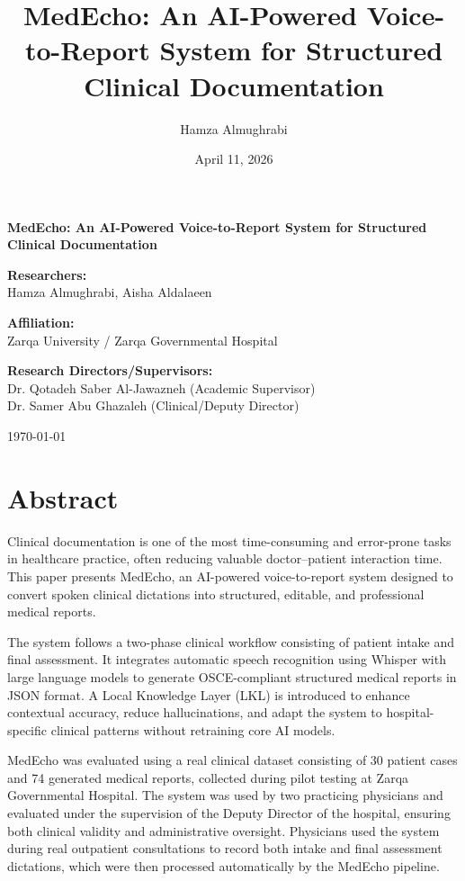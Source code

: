 \documentclass[12pt,a4paper]{article}
\title{MedEcho: An AI-Powered Voice-to-Report System for Structured Clinical Documentation}
\author{Hamza Almughrabi}
\date{April 11, 2026}
\begin{document}
\begin{titlepage}
    \centering
    \vspace*{1cm}
    {\huge \bfseries MedEcho: An AI-Powered Voice-to-Report System for Structured Clinical Documentation \par}
    \vspace{1.5cm}
    {\Large \textbf{Researchers:}\\ Hamza Almughrabi, Aisha Aldalaeen \par}
    \vspace{1cm}
    {\Large \textbf{Affiliation:}\\ Zarqa University / Zarqa Governmental Hospital \par}
    \vspace{1cm}
    {\Large \textbf{Research Directors/Supervisors:}\\ Dr. Qotadeh Saber Al-Jawazneh (Academic Supervisor) \\ Dr. Samer Abu Ghazaleh (Clinical/Deputy Director) \par}
    \vfill
    {\large \today \par}
\end{titlepage}

\section*{Abstract}
Clinical documentation is one of the most time-consuming and error-prone tasks in healthcare practice, often reducing valuable doctor–patient interaction time. This paper presents MedEcho, an AI-powered voice-to-report system designed to convert spoken clinical dictations into structured, editable, and professional medical reports.

The system follows a two-phase clinical workflow consisting of patient intake and final assessment. It integrates automatic speech recognition using Whisper with large language models to generate OSCE-compliant structured medical reports in JSON format. A Local Knowledge Layer (LKL) is introduced to enhance contextual accuracy, reduce hallucinations, and adapt the system to hospital-specific clinical patterns without retraining core AI models.

MedEcho was evaluated using a real clinical dataset consisting of 30 patient cases and 74 generated medical reports, collected during pilot testing at Zarqa Governmental Hospital. The system was used by two practicing physicians and evaluated under the supervision of the Deputy Director of the hospital, ensuring both clinical validity and administrative oversight. Physicians used the system during real outpatient consultations to record both intake and final assessment dictations, which were then processed automatically by the MedEcho pipeline.
\end{document}
